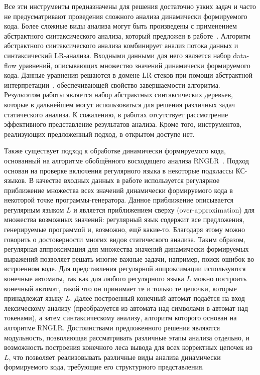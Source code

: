 \documentclass[14pt]{matmex-diploma}
\begin{document}
Все эти инструменты предназначены для решения достаточно узких задач и часто не предусматривают проведения сложного анализа динамически формируемого кода. Более сложные виды анализа могут быть произведены с применением абстрактного синтаксического анализа, который предложен в работе~\cite{LrAbstract2}. Алгоритм абстрактного синтаксического анализа комбинирует анализ потока данных и синтаксический LR-анализа. Входными данными для него является набор data-flow уравнений, описывающих множество значений динамически формируемого кода. Данные уравнения решаются в домене LR-стеков при помощи абстрактной интерпретации~\cite{AbstractInterpretation}, обеспечивающей свойство завершаемости алгоритма. Результатом работы является набор абстрактных синтаксических деревьев, которые в дальнейшем могут использоваться для решения различных задач статического анализа. К сожалению, в работах отсутствует рассмотрение эффективного представление результатов анализа. Кроме того, инструментов, реализующих предложенный подход, в открытом доступе нет.

Также существует подход к обработке динамически формируемого кода,  основанный на алгоритме обобщённого восходящего анализа RNGLR~\cite{RelaxedARNGLR}. Подход основан на проверке включения регулярного языка в некоторые подклассы КС-языков. В качестве входных данных в работе используется регулярное приближение множества всех значений динамически формируемого кода в некоторой точке программы-генератора. Данное приближение описывается регулярным языком $L$ и является приближением сверху (over-approximation) для множества возможных значений: регулярный язык содержит все предложения, генерируемые программой и, возможно, ещё какие-то. Благодаря этому можно говорить о достоверности многих видов статического анализа. Таким образом, регулярная аппроксимация для множества значений динамически формируемых выражений позволяет решать многие важные задачи, например, поиск ошибок во встроенном коде. Для представления регулярной аппроксимации используются конечные автоматы, так как для любого регулярного языка $L$ можно построить конечный автомат, такой что он принимает те и только те цепочки, которые принадлежат языку $L$. Далее построенный конечный автомат подаётся на вход лексическому анализу (преобразуется из автомата над символами в автомат над токенами), а затем синтаксическому анализу, алгоритм которого основан на алгоритме RNGLR. Достоинствами предложенного решения являются модульность, позволяющая рассматривать различные этапы анализа отдельно, и возможность построения конечного леса вывода для всех корректных цепочек из $L$, что позволяет реализовывать различные виды анализа динамически формируемого кода, требующие его структурного представления.
\end{document}
